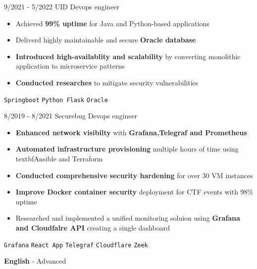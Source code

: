 \documentclass[9pt]{developercv} %
\begin{document}
\begin{center}
    \hdashrule[0.2ex]{\linewidth}{0.5pt}{.8mm}
\end{center}
\vspace{5pt}
\begin{entrylist}
    \entry
    {9/2021 - 5/2022}
    {UID}
    {Devops engineer}
    {\vspace{-6pt}
    \begin{itemize}[itemsep=2pt,topsep=0pt,parsep=0pt,partopsep=0pt, leftmargin=-1pt]
        \item{Achieved \textbf{99\% uptime} for Java and Python-based applications}
        \item{Deliverd highly maintainable and secure \textbf{Oracle database}}
        \item{\textbf{Introduced high-availablity and scalability} by converting monolithic application to microservice patterns}
        \item{\textbf{Conducted researches} to mitigate security vulnerabilities}
    \end{itemize}
    {\vspace{2pt}}
    \texttt{Springboot} \slashsep \texttt{Python Flask} \slashsep \texttt{Oracle}}
\end{entrylist}
\begin{center}
    \hdashrule[0.2ex]{\linewidth}{0.5pt}{.8mm}
\end{center}
\vspace{5pt}
\begin{entrylist}
    \entry
    {8/2019 - 8/2021}
    {Securebug}
    {Devops engineer}
    {\vspace{-6pt}
    \begin{itemize}[itemsep=2pt,topsep=0pt,parsep=0pt,partopsep=0pt, leftmargin=-1pt]
        \item{\textbf{Enhanced network visibilty} with \textbf{Grafana,Telegraf and Prometheus}}
        \item{\textbf{Automated infrastructure provisioning} multiple hours of time using textbf{Ansible and Terraform}}
        \item{\textbf{Conducted comprehensive security hardening} for over 30 VM instances}
        \item{\textbf{Improve Docker container security} deployment for CTF events with 98\% uptime}
        \item{Researched and implemented a unified monitoring soluion using \textbf{Grafana and Cloudfalre API} creating a single dashboard}
    \end{itemize}
    {\vspace{2pt}}
    \texttt{Grafana} \slashsep \texttt{React App} \slashsep \texttt{Telegraf} \slashsep \texttt{Cloudflare} \slashsep \texttt{Zeek}}
\end{entrylist}
\vspace{-10 pt}
\vspace{-6pt}

\hspace{26mm} \textbf{English} - Advanced

\end{document}
